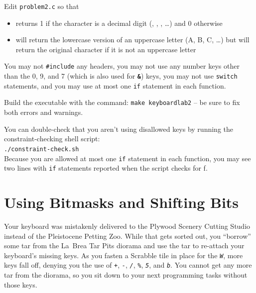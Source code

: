 Edit \texttt{problem2.c} so that
\begin{itemize}
\item {} returns 1 if the character is a decimal digit
    (\textquotesingle, \textquotesingle,
    \textquotesingle, \dots) and 0 otherwise
\item {} will return the lowercase version of an
    uppercase letter (\textquotesingle A\textquotesingle, \textquotesingle
    B\textquotesingle, \textquotesingle C\textquotesingle, \dots) but will
    return the original character if it is not an uppercase letter
\end{itemize}
You may not \lstinline{#include} any headers, you may not use any number keys
other than the 0, 9, and 7 (which is also used for \textbf{\texttt{\&}}) keys,
you may not use \lstinline{switch} statements, and you may use at most one
\lstinline{if} statement in each function.

Build the executable with the command: \texttt{make keyboardlab2} -- be sure to
fix both errors and warnings.

You can double-check that you aren't using disallowed keys by running the
constraint-checking shell script: \\
\texttt{./constraint-check.sh} \\
Because you are allowed at most one \lstinline{if} statement in each function,
you may see two lines with \lstinline{if} statements reported when the script
checks for \textquotesingle f\textquotesingle. %


\section{Using Bitmasks and Shifting Bits}

Your keyboard was mistakenly delivered to the Plywood Scenery Cutting Studio
instead of the Pleistocene Petting Zoo. While that gets sorted out, you
``borrow'' some tar from the La~Brea Tar Pits diorama and use the tar to
re-attach your keyboard's missing keys. As you fasten a Scrabble tile in place
for the \textit{\texttt{W}}, more keys fall off, denying you the use of
\textit{\texttt{+}}, \textit{\texttt{-}}, \textit{\texttt{/}},
\textit{\texttt{\%}}, \textit{\texttt{5}}, and \textit{\texttt{b}}. You cannot
get any more tar from the diorama, so you sit down to your next programming
tasks without those keys.

